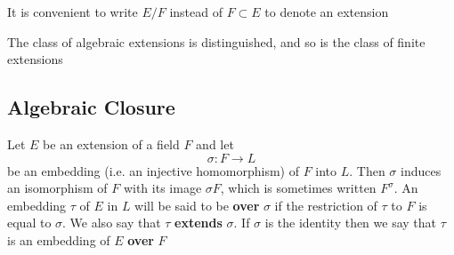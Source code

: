 \documentclass[11pt]{article}
\begin{document}
\begin{center}
   \hspace{1cm}
\hspace{1cm}
\end{center}


It is convenient to write \(E/F\) instead of \(F\subset E\) to denote an extension

\begin{proposition}[]
The class of algebraic extensions is distinguished, and so is the class of finite extensions
\end{proposition}
\subsection{Algebraic Closure}
\label{sec:org24cc127}
Let \(E\) be an extension of a field \(F\) and let
\begin{equation*}
\sigma:F\to L
\end{equation*}
be an embedding (i.e. an injective homomorphism) of \(F\) into \(L\). Then \(\sigma\) induces an
isomorphism of \(F\) with its image \(\sigma F\), which is sometimes written \(F^\sigma\). An embedding
\(\tau\) of \(E\) in \(L\) will be said to be \textbf{over} \(\sigma\) if the restriction of \(\tau\) to \(F\) is equal
to \(\sigma\). We also say that \(\tau\) \textbf{extends} \(\sigma\). If \(\sigma\) is the identity then we say that \(\tau\) is an
embedding of \(E\) \textbf{over} \(F\)
\begin{center}
\hspace{2cm}
\end{center}
\end{document}
